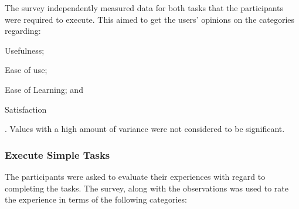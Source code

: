 The survey independently measured data for both tasks that the participants were
required to execute. This aimed to get the users' opinions on the categories
regarding: \begin{inparaenum}[(i)] \item Usefulness; \item Ease of use; \item
Ease of Learning; and \item Satisfaction \end{inparaenum}. Values with a high
amount of variance were not considered to be significant.\\

\subsubsection{Execute Simple Tasks}
The participants were asked to evaluate their experiences with regard to
completing the tasks. The survey, along with the observations was used to
rate the experience in terms of the following categories:
